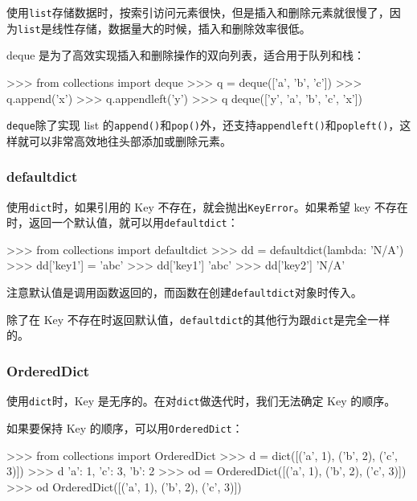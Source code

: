 使用\texttt{list}存储数据时，按索引访问元素很快，但是插入和删除元素就很慢了，因为\texttt{list}是线性存储，数据量大的时候，插入和删除效率很低。

deque 是为了高效实现插入和删除操作的双向列表，适合用于队列和栈：

\begin{pythoncode}
>>> from collections import deque
>>> q = deque(['a', 'b', 'c'])
>>> q.append('x')
>>> q.appendleft('y')
>>> q
deque(['y', 'a', 'b', 'c', 'x'])
\end{pythoncode}

\texttt{deque}除了实现 list
的\texttt{append()}和\texttt{pop()}外，还支持\texttt{appendleft()}和\texttt{popleft()}，这样就可以非常高效地往头部添加或删除元素。

\hypertarget{defaultdict}{%
\subsubsection{defaultdict}\label{defaultdict}}

使用\texttt{dict}时，如果引用的 Key
不存在，就会抛出\texttt{KeyError}。如果希望 key
不存在时，返回一个默认值，就可以用\texttt{defaultdict}：

\begin{pythoncode}
>>> from collections import defaultdict
>>> dd = defaultdict(lambda: 'N/A')
>>> dd['key1'] = 'abc'
>>> dd['key1'] 
'abc'
>>> dd['key2'] 
'N/A'
\end{pythoncode}

注意默认值是调用函数返回的，而函数在创建\texttt{defaultdict}对象时传入。

除了在 Key
不存在时返回默认值，\texttt{defaultdict}的其他行为跟\texttt{dict}是完全一样的。

\hypertarget{ordereddict}{%
\subsubsection{OrderedDict}\label{ordereddict}}

使用\texttt{dict}时，Key
是无序的。在对\texttt{dict}做迭代时，我们无法确定 Key 的顺序。

如果要保持 Key 的顺序，可以用\texttt{OrderedDict}：

\begin{pythoncode}
>>> from collections import OrderedDict
>>> d = dict([('a', 1), ('b', 2), ('c', 3)])
>>> d 
{'a': 1, 'c': 3, 'b': 2}
>>> od = OrderedDict([('a', 1), ('b', 2), ('c', 3)])
>>> od 
OrderedDict([('a', 1), ('b', 2), ('c', 3)])
\end{pythoncode}


